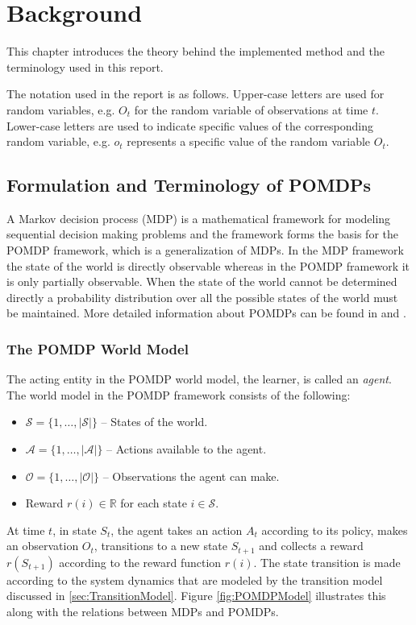 
\chapter{Background}
\label{ch:Background}
This chapter introduces the theory behind the implemented method and the terminology used in this report.

The notation used in the report is as follows. Upper-case letters are used for random variables, e.g. $O_t$ for the random variable of observations at time $t$. Lower-case letters are used to indicate specific values of the corresponding random variable, e.g. $o_t$ represents a specific value of the random variable $O_t$.

\section{Formulation and Terminology of POMDPs}
A Markov decision process (MDP) is a mathematical framework for modeling sequential decision making problems and the framework forms the basis for the POMDP framework, which is a generalization of MDPs. In the MDP framework the state of the world is directly observable whereas in the POMDP framework it is only partially observable. When the state of the world cannot be determined directly a probability distribution over all the possible states of the world must be maintained. More detailed information about POMDPs can be found in \cite{Kaelbling1998} and \cite{Aberdeen2003}.

\subsection{The POMDP World Model}
\label{sec:POMDPModel}
The acting entity in the POMDP world model, the learner, is called an \emph{agent}. The world model in the POMDP framework consists of the following:

\begin{itemize}
  \item $\mathcal{S} = \{1, \dotsc, |\mathcal{S}|\}$ -- States of the world.
  \item $\mathcal{A} = \{1, \dotsc, |\mathcal{A}|\}$ -- Actions available to the agent.
  \item $\mathcal{O} = \{1, \dotsc, |\mathcal{O}|\}$ -- Observations the agent can make.
  \item Reward $r(i) \in \mathds{R}$ for each state $i \in \mathcal{S}$.
\end{itemize}
At time $t$, in state $S_t$, the agent takes an action $A_t$ according to its policy, makes an observation $O_t$, transitions to a new state $S_{t+1}$ and collects a reward $r(S_{t+1})$ according to the reward function $r(i)$. The state transition is made according to the system dynamics that are modeled by the transition model discussed in \ref{sec:TransitionModel}. Figure \ref{fig:POMDPModel} illustrates this along with the relations between MDPs and POMDPs.

